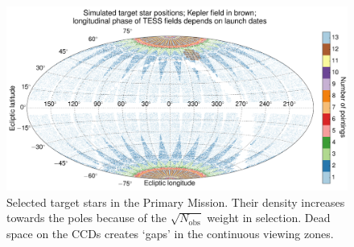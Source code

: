 \begin{figure}[!tb] %
	\centering
	\includegraphics{figures/positions_pointings_kepler.pdf}
	\caption{Selected target stars in the Primary Mission. Their density increases towards the poles because of the $\sqrt{N_\text{obs}}$ weight in selection. Dead space on the CCDs creates `gaps' in the continuous viewing zones.}
	\label{fig:positions_pointings}
\end{figure}

